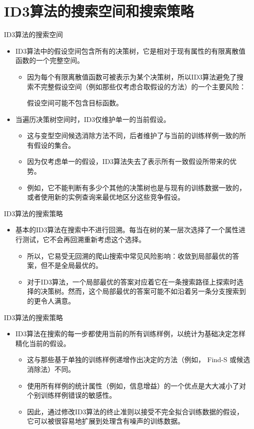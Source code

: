 \documentclass[presentation]{beamer}
\begin{document}
\section{ID3算法的搜索空间和搜索策略}
\label{sec:org2e20a70}
\begin{frame}[label={sec:orgc0a8681}]{ID3算法的搜索空间}
\begin{itemize}
\item ID3算法中的假设空间包含所有的决策树，它是相对于现有属性的有限离散值函数的一个完整空间。
\begin{itemize}
\item 因为每个有限离散值函数可被表示为某个决策树，所以ID3算法避免了搜索不完整假设空间（例如那些仅考虑合取假设的方法）的一个主要风险：

假设空间可能不包含目标函数。
\end{itemize}
\item 当遍历决策树空间时，ID3仅维护单一的当前假设。
\begin{itemize}
\item 这与变型空间候选消除方法不同，后者维护了与当前的训练样例一致的所有假设的集合。
\item 因为仅考虑单一的假设，ID3算法失去了表示所有一致假设所带来的优势。
\item 例如，它不能判断有多少个其他的决策树也是与现有的训练数据一致的，或者使用新的实例查询来最优地区分这些竞争假设。
\end{itemize}
\end{itemize}
\end{frame}
\begin{frame}[label={sec:org1d65122}]{ID3算法的搜索策略}
\begin{itemize}
\item 基本的ID3算法在搜索中不进行回溯。每当在树的某一层次选择了一个属性进行测试，它不会再回溯重新考虑这个选择。
\begin{itemize}
\item 所以，它易受无回溯的爬山搜索中常见风险影响：收敛到局部最优的答案，但不是全局最优的。
\item 对于ID3算法，一个局部最优的答案对应着它在一条搜索路径上探索时选择的决策树。然而，这个局部最优的答案可能不如沿着另一条分支搜索到的更令人满意。
\end{itemize}
\end{itemize}
\end{frame}
\begin{frame}[label={sec:org7e71dd6}]{ID3算法的搜索策略}
\begin{itemize}
\item ID3算法在搜索的每一步都使用当前的所有训练样例，以统计为基础决定怎样精化当前的假设。
\begin{itemize}
\item 这与那些基于单独的训练样例递增作出决定的方法（例如， Find-S 或候选消除法）不同。
\item 使用所有样例的统计属性（例如，信息增益）的一个优点是大大减小了对个别训练样例错误的敏感性。
\item 因此，通过修改ID3算法的终止准则以接受不完全拟合训练数据的假设，它可以被很容易地扩展到处理含有噪声的训练数据。
\end{itemize}
\end{itemize}
\end{frame}
\end{document}
